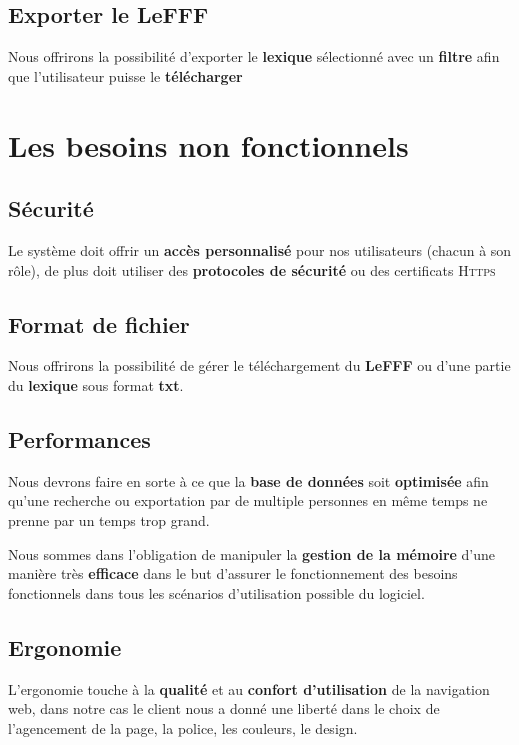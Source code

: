  \subsection{Exporter le LeFFF}

{Nous offrirons la possibilité d'exporter le \textbf{lexique} sélectionné avec un \textbf{filtre} afin que l'utilisateur puisse le \textbf{télécharger}\par}

\section{Les besoins non fonctionnels}

\subsection{Sécurité}
{Le système doit offrir un \textbf{accès personnalisé} pour nos utilisateurs (chacun à son rôle), de plus doit utiliser des \textbf{protocoles de sécurité} ou des certificats \textsc{Https} }

\subsection{Format de fichier}
Nous offrirons la possibilité de gérer le téléchargement du \textbf{LeFFF} ou d'une partie du \textbf{lexique} sous format \textbf{txt}.

\subsection{Performances}

{Nous devrons faire en sorte à ce que la \textbf{base de données} soit \textbf{optimisée} afin qu'une recherche ou exportation par de multiple personnes en même temps ne prenne par un temps trop grand.\par}
Nous sommes dans l'obligation de manipuler la \textbf{gestion de la mémoire} d'une manière très \textbf{efficace} dans le but d'assurer le fonctionnement des besoins fonctionnels dans tous les scénarios d'utilisation possible du logiciel. 

\subsection{Ergonomie}
L’ergonomie touche à la \textbf{qualité} et au \textbf{confort d’utilisation} de la navigation web, dans notre cas le client nous a donné une liberté dans le choix de l'agencement de la page, la police, les couleurs, le design. 
